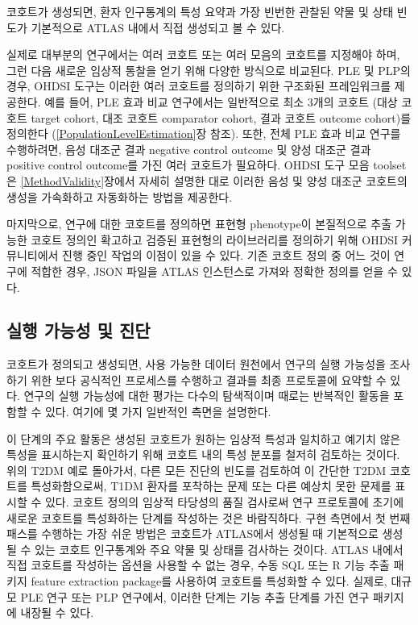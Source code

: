 \documentclass[10.5pt]{book}
\theoremstyle{definition}
\theoremstyle{definition}
\theoremstyle{definition}
\theoremstyle{remark}
\begin{document}
코호트가 생성되면, 환자 인구통계의 특성 요약과 가장 빈번한 관찰된 약물
및 상태 빈도가 기본적으로 ATLAS 내에서 직접 생성되고 볼 수 있다.

실제로 대부분의 연구에서는 여러 코호트 또는 여러 모음의 코호트를
지정해야 하며, 그런 다음 새로운 임상적 통찰을 얻기 위해 다양한 방식으로
비교된다. PLE 및 PLP의 경우, OHDSI 도구는 이러한 여러 코호트를 정의하기
위한 구조화된 프레임워크를 제공한다. 예를 들어, PLE 효과 비교 연구에서는
일반적으로 최소 3개의 코호트 (대상 코호트 target cohort, 대조 코호트
comparator cohort, 결과 코호트 outcome cohort)를 정의한다
(\ref{PopulationLevelEstimation}장 참조). 또한, 전체 PLE 효과 비교
연구를 수행하려면, 음성 대조군 결과 negative control outcome 및 양성
대조군 결과 positive control outcome를 가진 여러 코호트가 필요하다.
OHDSI 도구 모음 toolset은 \ref{MethodValidity}장에서 자세히 설명한 대로
이러한 음성 및 양성 대조군 코호트의 생성을 가속화하고 자동화하는 방법을
제공한다.

마지막으로, 연구에 대한 코호트를 정의하면 표현형 phenotype이 본질적으로
추출 가능한 코호트 정의인 확고하고 검증된 표현형의 라이브러리를 정의하기
위해 OHDSI 커뮤니티에서 진행 중인 작업의 이점이 있을 수 있다. 기존
코호트 정의 중 어느 것이 연구에 적합한 경우, JSON 파일을 ATLAS
인스턴스로 가져와 정확한 정의를 얻을 수 있다.

\subsection{실행 가능성 및 진단}\label{Feasibility}

 

코호트가 정의되고 생성되면, 사용 가능한 데이터 원천에서 연구의 실행
가능성을 조사하기 위한 보다 공식적인 프로세스를 수행하고 결과를 최종
프로토콜에 요약할 수 있다. 연구의 실행 가능성에 대한 평가는 다수의
탐색적이며 때로는 반복적인 활동을 포함할 수 있다. 여기에 몇 가지
일반적인 측면을 설명한다.

이 단계의 주요 활동은 생성된 코호트가 원하는 임상적 특성과 일치하고
예기치 않은 특성을 표시하는지 확인하기 위해 코호트 내의 특성 분포를
철저히 검토하는 것이다. 위의 T2DM 예로 돌아가서, 다른 모든 진단의 빈도를
검토하여 이 간단한 T2DM 코호트를 특성화함으로써, T1DM 환자를 포착하는
문제 또는 다른 예상치 못한 문제를 표시할 수 있다. 코호트 정의의 임상적
타당성의 품질 검사로써 연구 프로토콜에 초기에 새로운 코호트를 특성화하는
단계를 작성하는 것은 바람직하다. 구현 측면에서 첫 번째 패스를 수행하는
가장 쉬운 방법은 코호트가 ATLAS에서 생성될 때 기본적으로 생성될 수 있는
코호트 인구통계와 주요 약물 및 상태를 검사하는 것이다. ATLAS 내에서 직접
코호트를 작성하는 옵션을 사용할 수 없는 경우, 수동 SQL 또는 R 기능 추출
패키지 feature extraction package를 사용하여 코호트를 특성화할 수 있다.
실제로, 대규모 PLE 연구 또는 PLP 연구에서, 이러한 단계는 기능 추출
단계를 가진 연구 패키지에 내장될 수 있다.
\end{document}
